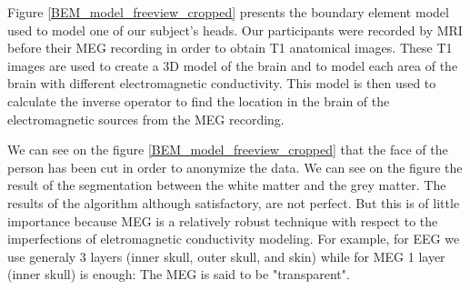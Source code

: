 Figure \ref{BEM_model_freeview_cropped} presents the boundary element model used to model one of our subject's heads. Our participants were recorded by MRI before their MEG recording in order to obtain T1 anatomical images. These T1 images are used to create a 3D model of the brain and to model each area of the brain with different electromagnetic conductivity. This model is then used to calculate the inverse operator to find the location in the brain of the electromagnetic sources from the MEG recording.

We can see on the figure \ref{BEM_model_freeview_cropped} that the face of the person has been cut in order to anonymize the data.  We can see on the figure the result of the segmentation between the white matter and the grey matter. The results of the algorithm although satisfactory, are not perfect. But this is of little importance because MEG is a relatively robust technique with respect to the imperfections of eletromagnetic conductivity modeling. For example, for EEG we use generaly 3 layers (inner skull, outer skull, and skin) while for MEG 1 layer (inner skull) is enough: The MEG is said to be "transparent".


